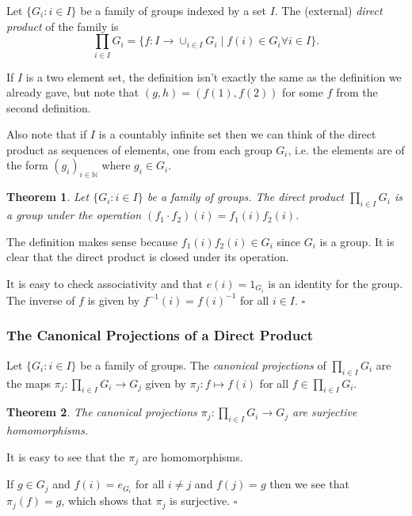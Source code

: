 \documentclass[10pt]{article}
\newtheorem{theorem}{Theorem}[section]
\newenvironment{proof}[1][Proof]{\begin{trivlist}
\item[\hskip \labelsep {\itshape #1}]}{\end{trivlist}}
\newenvironment{definition}[1][Definition]{\begin{trivlist}
\item[\hskip \labelsep {\bfseries #1}]}{\end{trivlist}}
\begin{document}
\begin{definition}
Let $\{G_i : i \in I\}$ be a family of groups indexed by a set $I$. The (external) \emph{direct product} of the family is
$$\prod_{i \in I} G_i = \{f : I \to \cup_{i \in I} G_i \;|\; f(i) \in G_i \forall i \in I\}.$$
\end{definition}

If $I$ is a two element set, the definition isn't exactly the same as the definition we already gave, but note that $(g, h) = (f(1), f(2))$ for some $f$ from the second definition.

Also note that if $I$ is a countably infinite set then we can think of the direct product as sequences of elements, one from each group $G_i$, i.e. the elements are of the form $(g_i)_{i \in \mathbb{N}}$ where $g_i \in G_i$.

\begin{theorem}
Let $\{G_i : i \in I\}$ be a family of groups. The direct product $\prod_{i \in I} G_i$ is a group under the operation $(f_1\cdot f_2)(i) = f_1(i)f_2(i)$.
\end{theorem}

\begin{proof}
The definition makes sense because $f_1(i)f_2(i) \in G_i$ since $G_i$ is a group. It is clear that the direct product is closed under its operation.

It is easy to check associativity and that $e(i) = 1_{G_i}$ is an identity for the group. The inverse of $f$ is given by $f^{-1}(i) = f(i)^{-1}$ for all $i \in I$. $\square$
\end{proof}

\subsubsection{The Canonical Projections of a Direct Product}

\begin{definition}
Let $\{G_i : i \in I\}$ be a family of groups. The \emph{canonical projections} of $\prod_{i \in I} G_i$ are the maps $\pi_j : \prod_{i \in I} G_i \to G_j$ given by $\pi_j : f \mapsto f(i)$ for all $f \in \prod_{i \in I} G_i$.
\end{definition}

\begin{theorem}
The canonical projections $\pi_j : \prod_{i \in I} G_i \to G_j$ are surjective homomorphisms.
\end{theorem}

\begin{proof}
It is easy to see that the $\pi_j$ are homomorphisms.

If $g \in G_j$ and $f(i) = e_{G_i}$ for all $i \neq j$ and $f(j) = g$ then we see that $\pi_j(f) = g$, which shows that $\pi_j$ is surjective. $\square$
\end{proof}
\end{document}
